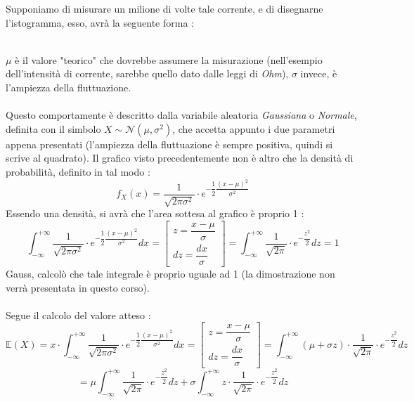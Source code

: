 \documentclass[12pt, letterpaper]{article}
\newcommand{\E}{{\mathbb E}}
\newcommand{\acc}{\\\hphantom{}\\}
\begin{document}
Supponiamo di misurare un milione di volte tale corrente, e di disegnarne 
l'istogramma, esso, avrà la seguente forma : \begin{figure}[h]
\end{figure}
\\\(\mu\) è il valore "teorico" che dovrebbe assumere la misurazione (nell'esempio dell'intensità di corrente, 
sarebbe quello dato dalle leggi di \textit{Ohm}), \(\sigma\) invece, è l'ampiezza della fluttuazione.\acc 
Questo comportamente è descritto dalla variabile aleatoria \textit{Gaussiana} o \textit{Normale}, definita 
con il simbolo \(X\sim \mathcal{N}(\mu,\sigma^2)\), che accetta appunto i due parametri appena presentati (l'ampiezza della 
fluttuazione è sempre positiva, quindi si scrive al quadrato).
Il grafico visto precedentemente non è altro che la densità di probabilità, definito in tal modo : 
$$f_X(x)=\dfrac{1}{\sqrt{2\pi\sigma^2}}\cdot e^{-\dfrac{1}{2}\dfrac{(x-\mu)^2}{\sigma^2}}$$
Essendo una densità, si avrà che l'area sottesa al grafico è proprio 1 : 
\begin{equation}
    \int_{-\infty}^{+\infty}\dfrac{1}{\sqrt{2\pi\sigma^2}}\cdot e^{-\dfrac{1}{2}\dfrac{(x-\mu)^2}{\sigma^2}}dx 
    =\begin{bmatrix}
        z=\dfrac{x-\mu}{\sigma}\\ dz=\dfrac{dx}{\sigma}
    \end{bmatrix}=
    \int_{-\infty}^{+\infty}\dfrac{1}{\sqrt{2\pi}}\cdot e^{-\dfrac{z^2}{2}}dz=1
\end{equation}
Gauss, calcolò che tale integrale è proprio uguale ad 1 (la dimostrazione non verrà presentata
 in questo corso).\acc 
 Segue il calcolo del valore atteso : \begin{equation}
    \E(X)=x\cdot\int_{-\infty}^{+\infty}\dfrac{1}{\sqrt{2\pi\sigma^2}}\cdot e^{-\dfrac{1}{2}\dfrac{(x-\mu)^2}{\sigma^2}}dx
    =\begin{bmatrix}
        z=\dfrac{x-\mu}{\sigma}\\ dz=\dfrac{dx}{\sigma}
    \end{bmatrix}=
    \int_{-\infty}^{+\infty}(\mu+\sigma z)\cdot \dfrac{1}{\sqrt{2\pi}}\cdot e^{-\dfrac{z^2}{2}}dz
\end{equation}\begin{equation}
    =\mu\int_{-\infty}^{+\infty}\dfrac{1}{\sqrt{2\pi}}\cdot e^{-\dfrac{z^2}{2}}dz+
    \sigma \int_{-\infty}^{+\infty}z\cdot \dfrac{1}{\sqrt{2\pi}}\cdot e^{-\dfrac{z^2}{2}}dz
\end{equation}
\end{document}
